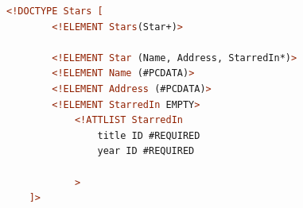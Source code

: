 \documentclass[12pt]{article}
\begin{document}
\begin{enumerate}[1.]
\begin{enumerate}[a)]
    \begin{lstlisting}[language=XML]
    <!DOCTYPE Stars [
        <!ELEMENT Stars(Star+)>

        <!ELEMENT Star (Name, Address, StarredIn*)>
        <!ELEMENT Name (#PCDATA)>
        <!ELEMENT Address (#PCDATA)>
        <!ELEMENT StarredIn EMPTY>
            <!ATTLIST StarredIn
                title ID #REQUIRED
                year ID #REQUIRED

            >
    ]>
    \end{lstlisting}

    \end{enumerate}


\end{enumerate}
\end{document}
